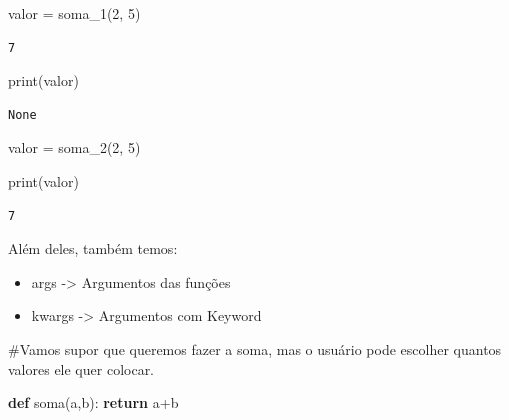 \documentclass[
  letterpaper,
  DIV=11,
  numbers=noendperiod]{scrreprt}
\newenvironment{Shaded}{\begin{snugshade}}{\end{snugshade}}
\newcommand{\BuiltInTok}[1]{\textcolor[rgb]{0.00,0.23,0.31}{#1}}
\newcommand{\CommentTok}[1]{\textcolor[rgb]{0.37,0.37,0.37}{#1}}
\newcommand{\ControlFlowTok}[1]{\textcolor[rgb]{0.00,0.23,0.31}{\textbf{#1}}}
\newcommand{\DecValTok}[1]{\textcolor[rgb]{0.68,0.00,0.00}{#1}}
\newcommand{\KeywordTok}[1]{\textcolor[rgb]{0.00,0.23,0.31}{\textbf{#1}}}
\newcommand{\NormalTok}[1]{\textcolor[rgb]{0.00,0.23,0.31}{#1}}
\newcommand{\OperatorTok}[1]{\textcolor[rgb]{0.37,0.37,0.37}{#1}}
\providecommand{\tightlist}{%
  \setlength{\itemsep}{0pt}\setlength{\parskip}{0pt}}
\begin{document}
\begin{Shaded}
\begin{Highlighting}[]
\NormalTok{valor }\OperatorTok{=}\NormalTok{ soma\_1(}\DecValTok{2}\NormalTok{, }\DecValTok{5}\NormalTok{)}
\end{Highlighting}
\end{Shaded}

\begin{verbatim}
7
\end{verbatim}

\begin{Shaded}
\begin{Highlighting}[]
\BuiltInTok{print}\NormalTok{(valor)}
\end{Highlighting}
\end{Shaded}

\begin{verbatim}
None
\end{verbatim}

\begin{Shaded}
\begin{Highlighting}[]
\NormalTok{valor }\OperatorTok{=}\NormalTok{ soma\_2(}\DecValTok{2}\NormalTok{, }\DecValTok{5}\NormalTok{)}
\end{Highlighting}
\end{Shaded}

\begin{Shaded}
\begin{Highlighting}[]
\BuiltInTok{print}\NormalTok{(valor)}
\end{Highlighting}
\end{Shaded}

\begin{verbatim}
7
\end{verbatim}

Além deles, também temos:

\begin{itemize}
\tightlist
\item
  args -\textgreater{} Argumentos das funções
\item
  kwargs -\textgreater{} Argumentos com Keyword
\end{itemize}

\begin{Shaded}
\begin{Highlighting}[]
\CommentTok{\#Vamos supor que queremos fazer a soma, mas o usuário pode escolher quantos valores ele quer colocar.}

\KeywordTok{def}\NormalTok{ soma(a,b):}
    \ControlFlowTok{return}\NormalTok{ a}\OperatorTok{+}\NormalTok{b}
\end{Highlighting}
\end{Shaded}
\end{document}
